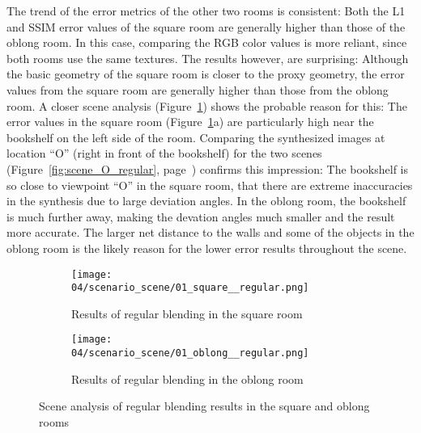 The trend of the error metrics of the other two rooms is consistent: Both the L1 and SSIM error values of the square room are generally higher than those of the oblong room. In this case, comparing the RGB color values is more reliant, since both rooms use the same textures. The results however, are surprising: Although the basic geometry of the square room is closer to the proxy geometry, the error values from the square room are generally higher than those from the oblong room.
A closer scene analysis (Figure~\ref{fig:scene_regular_square_oblong}) shows the probable reason for this: The error values in the square room (Figure~\ref{fig:scene_regular_square_oblong}a) are particularly high near the bookshelf on the left side of the room. Comparing the synthesized images at location ``O'' (right in front of the bookshelf) for the two scenes (Figure~\ref{fig:scene_O_regular}, page~\pageref{fig:scene_O_regular}) confirms this impression: The bookshelf is so close to viewpoint ``O'' in the square room, that there are extreme inaccuracies in the synthesis due to large deviation angles. In the oblong room, the bookshelf is much further away, making the devation angles much smaller and the result more accurate. The larger net distance to the walls and some of the objects in the oblong room is the likely reason for the lower error results throughout the scene.

\begin{figure}
\centering
    \hfill
    \begin{subfigure}[b]{0.45\textwidth}
            \centering
            \texttt{[image: 04/scenario\_scene/01\_square\_\_regular.png]}
            \caption{Results of regular blending in the square room}
    \end{subfigure}
    \hfill
    \begin{subfigure}[b]{0.45\textwidth}
            \centering
            \texttt{[image: 04/scenario\_scene/01\_oblong\_\_regular.png]}
            \caption{Results of regular blending in the oblong room}
    \end{subfigure}
    \hfill
  \caption{Scene analysis of regular blending results in the square and oblong rooms} \label{fig:scene_regular_square_oblong}
\end{figure}

